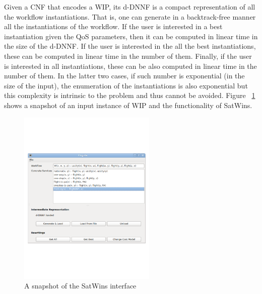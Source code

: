 \documentclass{llncs}
\begin{document}
Given a CNF that encodes a WIP, its d-DNNF is a compact representation of
all the workflow instantiations. That is, one can generate in a backtrack-free
manner all the instantiations of the workflow. If the user is interested in
a best instantiation given the QoS parameters, then it can be computed in
linear time in the size of the d-DNNF. If the user is interested in the 
all the best instantiations, these can be computed in linear time in the
number of them. Finally, if the user is interested in all instantiations,
these can be also computed in linear time in the number of them.
In the latter two cases, if such number is exponential (in the size of the
input), the enumeration of the instantiations is also exponential but
this complexity is intrinsic to the problem and thus cannot be avoided.
Figure ~\ref{fig:snapshot} shows a snapshot of an input instance of WIP and the functionality of SatWins. 

\begin{figure}[t]
\centering
\includegraphics[height=85mm,width=.8\textwidth]{demo}
\caption{A snapshot of the SatWins interface}
\label{fig:snapshot}
\end{figure}
\end{document}
